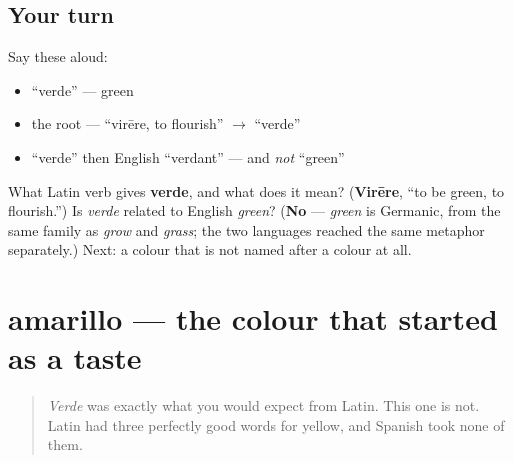 \subsection*{Your turn}
Say these aloud:

\begin{itemize}
\raggedright
  \item \textquotedblleft{}verde\textquotedblright{} — green
  \item the root — \textquotedblleft{}virēre, to flourish\textquotedblright{} $\to$ \textquotedblleft{}verde\textquotedblright{}
  \item \textquotedblleft{}verde\textquotedblright{} then English \textquotedblleft{}verdant\textquotedblright{} — and \emph{not} \textquotedblleft{}green\textquotedblright{}
\end{itemize}

\begin{tcolorbox}[breakable,colback=teal!4,colframe=teal!35!black,title={Before you move on}]
What Latin verb gives \textbf{verde}, and what does it mean? (\textbf{Virēre}, \textquotedblleft{}to be green, to flourish.\textquotedblright{}) Is \emph{verde} related to English \emph{green}? (\textbf{No} — \emph{green} is Germanic, from the same family as \emph{grow} and \emph{grass}; the two languages reached the same metaphor separately.) Next: a colour that is not named after a colour at all.
\end{tcolorbox}
\section[amarillo]{amarillo — the colour that started as a taste}

\label{lesson:ES-C33-amarillo}



\begin{quote}
\emph{Verde} was exactly what you would expect from Latin. This one is not. Latin had three perfectly good words for yellow, and Spanish took none of them.
\end{quote}

